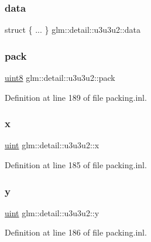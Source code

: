 \subsubsection{\texorpdfstring{data}{data}}
{\footnotesize\ttfamily struct \{ ... \}   glm\+::detail\+::u3u3u2\+::data}

\mbox{\label{unionglm_1_1detail_1_1u3u3u2_aea48c2c7d1d3283f3c785daa33551351}} 
\subsubsection{\texorpdfstring{pack}{pack}}
{\footnotesize\ttfamily \mbox{\hyperlink{namespaceglm_1_1detail_aef2588f97d090cc19fbbe0c74fe17c8f}{uint8}} glm\+::detail\+::u3u3u2\+::pack}



Definition at line 189 of file packing.\+inl.

\mbox{\label{unionglm_1_1detail_1_1u3u3u2_aaa6af1d1bd34a7e72c0d7b1bb622a4da}} 
\subsubsection{\texorpdfstring{x}{x}}
{\footnotesize\ttfamily \mbox{\hyperlink{group__core__precision_ga4fd29415871152bfb5abd588334147c8}{uint}} glm\+::detail\+::u3u3u2\+::x}



Definition at line 185 of file packing.\+inl.

\mbox{\label{unionglm_1_1detail_1_1u3u3u2_a2139299d7ae9d48a986ddd3edff8d669}} 
\subsubsection{\texorpdfstring{y}{y}}
{\footnotesize\ttfamily \mbox{\hyperlink{group__core__precision_ga4fd29415871152bfb5abd588334147c8}{uint}} glm\+::detail\+::u3u3u2\+::y}



Definition at line 186 of file packing.\+inl.

